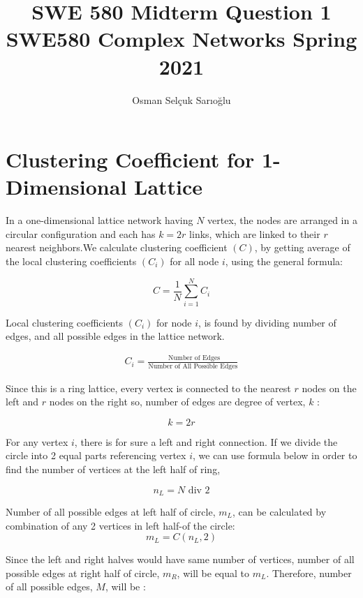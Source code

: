 \documentclass[11pt,a4,twocolumn]{article}
\title{
	SWE 580 Midterm Question 1\\
	SWE580 Complex Networks Spring 2021\\
}
\author{Osman Selçuk Sarıoğlu}
\theoremstyle{plain}
\theoremstyle{definition}
\theoremstyle{remark}
\begin{document}
\maketitle




\section{Clustering Coefficient for 1-Dimensional Lattice}

In a one-dimensional lattice network having $N$ vertex, the nodes are arranged in a circular configuration and each has $k = 2r$ links, which are linked to their $r$ nearest neighbors.We calculate clustering coefficient $(C)$, by getting average of the local clustering coefficients  $(C_i)$ for all node $i$, using
the general formula:

\[
C = \frac{1}{N} \sum_{i=1}^N C_i
\]

\par
\noindent Local clustering coefficients  $(C_i)$ for node $i$, is found by dividing number of edges, and all possible edges in the lattice network. 

\begin{align*}
C_i = \frac{\text{ Number of Edges} }{\text{Number of All Possible Edges} } 
\end{align*}

\par
\noindent Since this is a ring lattice, every vertex is connected to the nearest $r$ nodes on the left and $r$ nodes on the right so, number of edges are degree of vertex, $k$ : 

\[
k = 2r
\]

\par
\noindent For any vertex $i$, there is for sure a left and right connection. If we divide the circle into 2 equal parts referencing vertex $i$, we can use formula below in order to find the number of vertices at the left half of ring, 

\[
n_L = N \text{ div  } 2 
\]

\par
\noindent Number of all possible edges at left half of circle, $m_L$, can be calculated by combination of any 2 vertices in left half-of the circle: 
\[
m_L = C ( n_L, 2) 
\]

\par
\noindent Since the left and right halves would have same number of vertices, number of all possible edges at right half of circle, $m_R$, will be equal to  $m_L$. Therefore, number of all possible edges, $M$, will be :
\end{document}
